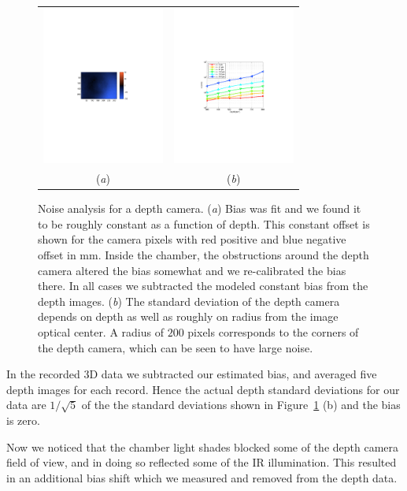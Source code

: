 \begin{figure}
\centering
\begin{tabular}{ c c }
  \includegraphics[height=5.2cm,trim=160 300 170 310,clip]{Figures/BiasError} &
  \includegraphics[height=5.2cm,trim=110 240 50 260,clip]{Figures/SigmaRadius} \\
  (\emph{a}) & (\emph{b}) \\
\end{tabular}
\caption{Noise analysis for a depth camera.  (\emph{a}) Bias was fit and we found it to be roughly constant as a function of depth.  This constant offset is shown for the camera pixels with red positive and blue negative offset in mm.  Inside the chamber, the obstructions around the depth camera altered the bias somewhat and we re-calibrated the bias there.  In all cases we subtracted the modeled constant bias from the depth images.  (\emph{b}) The standard deviation of the depth camera depends on depth as well as roughly on radius from the image optical center.  A radius of $200$ pixels corresponds to the corners of the depth camera, which can be seen to have large noise. }
\label{fig:Bias}
\end{figure}


In the recorded $3$D data we subtracted our estimated bias, and averaged five depth images for each record.  Hence the actual depth standard deviations for our data are $1/\sqrt{5}$ of the the standard deviations shown in Figure~\ref{fig:Bias} (b) and the bias is zero.

Now we noticed that the chamber light shades blocked some of the depth camera field of view, and in doing so reflected some of the IR illumination.  This resulted in an additional bias shift which we measured and removed from the depth data. %
